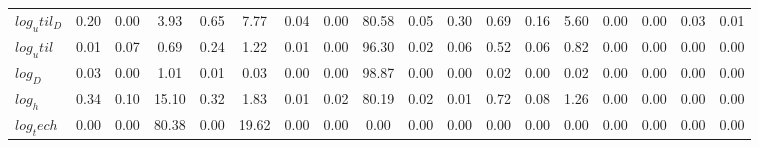 \begin{center}
\begin{longtable}{lccccccccccccccccc}
$log_util_D   $	 & 	            0.20	 & 	            0.00	 & 	            3.93	 & 	            0.65	 & 	            7.77	 & 	            0.04	 & 	            0.00	 & 	           80.58	 & 	            0.05	 & 	            0.30	 & 	            0.69	 & 	            0.16	 & 	            5.60	 & 	            0.00	 & 	            0.00	 & 	            0.03	 & 	            0.01 \\ 
$log_util     $	 & 	            0.01	 & 	            0.07	 & 	            0.69	 & 	            0.24	 & 	            1.22	 & 	            0.01	 & 	            0.00	 & 	           96.30	 & 	            0.02	 & 	            0.06	 & 	            0.52	 & 	            0.06	 & 	            0.82	 & 	            0.00	 & 	            0.00	 & 	            0.00	 & 	            0.00 \\ 
$log_D        $	 & 	            0.03	 & 	            0.00	 & 	            1.01	 & 	            0.01	 & 	            0.03	 & 	            0.00	 & 	            0.00	 & 	           98.87	 & 	            0.00	 & 	            0.00	 & 	            0.02	 & 	            0.00	 & 	            0.02	 & 	            0.00	 & 	            0.00	 & 	            0.00	 & 	            0.00 \\ 
$log_h        $	 & 	            0.34	 & 	            0.10	 & 	           15.10	 & 	            0.32	 & 	            1.83	 & 	            0.01	 & 	            0.02	 & 	           80.19	 & 	            0.02	 & 	            0.01	 & 	            0.72	 & 	            0.08	 & 	            1.26	 & 	            0.00	 & 	            0.00	 & 	            0.00	 & 	            0.00 \\ 
$log_tech     $	 & 	            0.00	 & 	            0.00	 & 	           80.38	 & 	            0.00	 & 	           19.62	 & 	            0.00	 & 	            0.00	 & 	            0.00	 & 	            0.00	 & 	            0.00	 & 	            0.00	 & 	            0.00	 & 	            0.00	 & 	            0.00	 & 	            0.00	 & 	            0.00	 & 	            0.00 \\ 
\end{longtable}
 \end{center}
